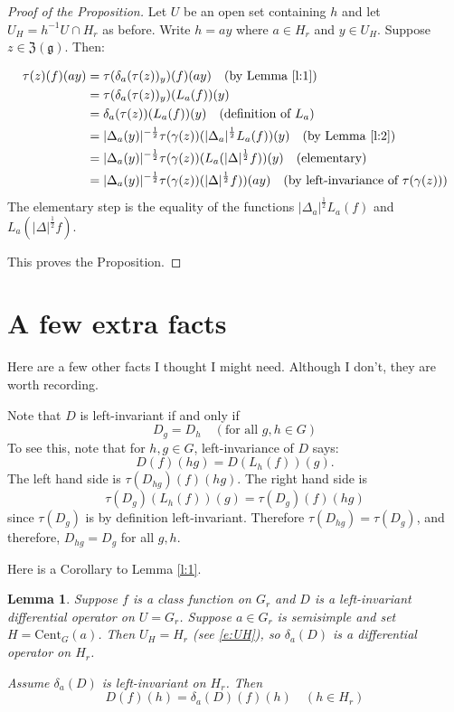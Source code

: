 \documentclass{article}
\newtheorem{lem}[thm]{Lemma}
\theoremstyle{definition}
\numberwithin{equation}{section}
\renewcommand{\-}{\hyp{}}
\newcommand{\inv}{^{-1}}
\newcommand{\z}{\mathfrak Z}
\newcommand{\g}{\mathfrak g}
\newcommand{\Cent}{\mathrm{Cent}}
\begin{document}
\begin{proof}[Proof of the Proposition]

Let $U$ be an open set containing $h$ and let $U_H=h\inv U\cap H_r$ as before. 
Write $h=ay$ where $a\in H_r$ and $y\in U_H$.
Suppose $z\in\z(\g)$. Then:

$$
\begin{aligned}
  \tau(z)(f)(ay)&=\tau(\delta_a(\tau(z))_y)(f)(ay)\quad\text{(by Lemma \ref{l:1})}\\
&=  \tau(\delta_a(\tau(z))_y)(L_a(f))(y)\\
 &= \delta_a(\tau(z))(L_a(f))(y)\quad\text{(definition of $L_a$)}\\
 &= |\Delta_a(y)|^{-\frac12}\tau(\gamma(z))(|\Delta_a|^{\frac12}L_a(f))(y)\quad\text{(by Lemma \ref{l:2})}\\
 &= |\Delta_a(y)|^{-\frac12}\tau(\gamma(z))(L_a(|\Delta|^{\frac12}f))(y)\quad\text{(elementary)}\\
   &= |\Delta_a(y)|^{-\frac12}\tau(\gamma(z))(|\Delta|^{\frac12}f))(ay)\quad\text{(by left-invariance of $\tau(\gamma(z))$)}
\end{aligned}
$$
The elementary step is the equality of the functions $|\Delta_a|^{\frac12}L_a(f)$ 
and
 $L_a(|\Delta|^{\frac12}f)$.

This proves the Proposition.
\end{proof}


\section{A few extra facts}

Here are a few other facts I thought I might need. Although I don't, they are worth recording.

Note that $D$ is left-invariant if and only if
\begin{equation}
  \label{e:left}
  D_g=D_h\quad(\text{for all }g,h\in G)
\end{equation}
To see this, note that for $h,g\in G$, left-invariance of $D$ says:
$$
D(f)(hg)=D(L_h(f))(g).
$$
The left hand side is $\tau(D_{hg})(f)(hg)$. The right hand side is
$$
\tau(D_g)(L_h(f))(g)=\tau(D_g)(f)(hg)
$$
since $\tau(D_g)$ is by definition  left-invariant. Therefore $\tau(D_{hg})=\tau(D_g)$, and therefore, $D_{hg}=D_g$ for all $g,h$.

Here is a Corollary to Lemma \ref{l:1}.

\begin{lem}
  Suppose $f$ is a class function on $G_r$ and $D$ is a left-invariant differential operator on $U=G_r$.
  Suppose $a\in G_r$ is semisimple and set $H=\Cent_G(a)$. Then $U_H=H_r$ (see \eqref{e:UH}), so $\delta_a(D)$
  is a  differential operator on $H_r$.

  Assume $\delta_a(D)$ is left-invariant on $H_r$. Then
  $$
  D(f)(h)=\delta_a(D)(f)(h)\quad (h\in H_r)
  $$
\end{lem}
\end{document}
